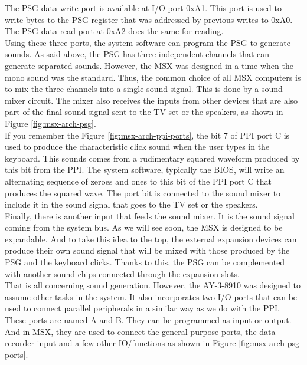 The PSG data write port is available at I/O port 0xA1. This port is used to write bytes to the PSG register that was addressed by previous writes to 0xA0. The PSG data read port at 0xA2 does the same for reading. \\

Using these three ports, the system software can program the PSG to generate sounds. As said above, the PSG has three independent channels that can generate separated sounds. However, the MSX was designed in a time when the mono sound was the standard. Thus, the common choice of all MSX computers is to mix the three channels into a single sound signal. This is done by a sound mixer circuit. The mixer also receives the inputs from other devices that are also part of the final sound signal sent to the TV set or the speakers, as shown in Figure \ref{fig:msx-arch-psg}. \\

If you remember the Figure \ref{fig:msx-arch-ppi-ports}, the bit 7 of PPI port C is used to produce the characteristic click sound when the user types in the keyboard. This sounds comes from a rudimentary squared waveform produced by this bit from the PPI. The system software, typically the BIOS, will write an alternating sequence of zeroes and ones to this bit of the PPI port C that produces the squared wave. The port bit is connected to the sound mixer to include it in the sound signal that goes to the TV set or the speakers. \\

Finally, there is another input that feeds the sound mixer. It is the sound signal coming from the system bus. As we will see soon, the MSX is designed to be expandable. And to take this idea to the top, the external expansion devices can produce their own sound signal that will be mixed with those produced by the PSG and the keyboard clicks. Thanks to this, the PSG can be complemented with another sound chips connected through the expansion slots. \\

That is all concerning sound generation. However, the AY-3-8910 was designed to assume other tasks in the system. It also incorporates two I/O ports that can be used to connect parallel peripherals in a similar way as we do with the PPI. These ports are named A and B. They can be programmed as input or output. And in MSX, they are used to connect the general-purpose ports, the data recorder input and a few other IO/functions as shown in Figure \ref{fig:msx-arch-psg-ports}. \\

